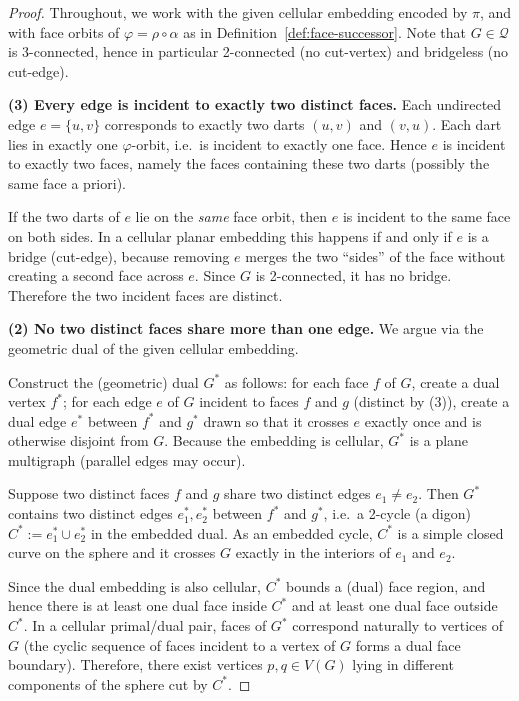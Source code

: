 \documentclass[12pt]{article}
\theoremstyle{definition}
\begin{document}
\begin{proof}
Throughout, we work with the given cellular embedding encoded by $\pi$, and with face orbits of
$\varphi=\rho\circ\alpha$ as in Definition~\ref{def:face-successor}. Note that $G\in\mathcal{Q}$ is 3-connected,
hence in particular 2-connected (no cut-vertex) and bridgeless (no cut-edge).

\medskip
\noindent\textbf{(3) Every edge is incident to exactly two distinct faces.}
Each undirected edge $e=\{u,v\}$ corresponds to exactly two darts $(u,v)$ and $(v,u)$.
Each dart lies in exactly one $\varphi$-orbit, i.e.\ is incident to exactly one face.
Hence $e$ is incident to exactly two faces, namely the faces containing these two darts
(possibly the same face a priori).

If the two darts of $e$ lie on the \emph{same} face orbit, then $e$ is incident to the same face on both
sides. In a cellular planar embedding this happens if and only if $e$ is a bridge (cut-edge), because
removing $e$ merges the two ``sides'' of the face without creating a second face across $e$.
Since $G$ is 2-connected, it has no bridge. Therefore the two incident faces are distinct.

\medskip
\noindent\textbf{(2) No two distinct faces share more than one edge.}
We argue via the geometric dual of the given cellular embedding.

Construct the (geometric) dual $G^*$ as follows: for each face $f$ of $G$, create a dual vertex $f^*$;
for each edge $e$ of $G$ incident to faces $f$ and $g$ (distinct by (3)), create a dual edge $e^*$
between $f^*$ and $g^*$ drawn so that it crosses $e$ exactly once and is otherwise disjoint from $G$.
Because the embedding is cellular, $G^*$ is a plane multigraph (parallel edges may occur).

Suppose two distinct faces $f$ and $g$ share two distinct edges $e_1\neq e_2$.
Then $G^*$ contains two distinct edges $e_1^*,e_2^*$ between $f^*$ and $g^*$, i.e.\ a 2-cycle
(a digon) $C^* := e_1^* \cup e_2^*$ in the embedded dual.
As an embedded cycle, $C^*$ is a simple closed curve on the sphere and it crosses $G$
exactly in the interiors of $e_1$ and $e_2$.

Since the dual embedding is also cellular, $C^*$ bounds a (dual) face region, and hence there is at least
one dual face inside $C^*$ and at least one dual face outside $C^*$. In a cellular primal/dual pair,
faces of $G^*$ correspond naturally to vertices of $G$ (the cyclic sequence of faces incident to a vertex
of $G$ forms a dual face boundary). Therefore, there exist vertices $p,q\in V(G)$ lying in different
components of the sphere cut by $C^*$.


\end{proof}
\end{document}
